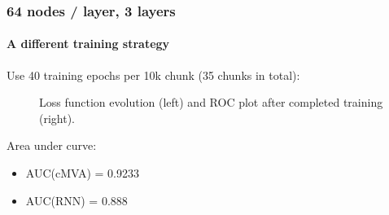 \documentclass{beamer}
\begin{document}
\begin{frame}
  \frametitle{64 nodes / layer, 3 layers}
  \framesubtitle{A different training strategy}
  Use 40 training epochs per 10k chunk (35 chunks in total):

    \begin{figure}[htb]
    \centering

    \caption{Loss function evolution (left) and ROC plot after completed training (right).}
    \end{figure}

    Area under curve:
    \begin{itemize}
    \item AUC(cMVA) = 0.9233
    \item AUC(RNN) = 0.888
    \end{itemize}
\end{frame}
\end{document}
